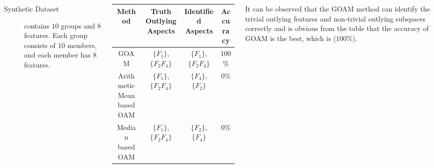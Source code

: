 \documentclass{tikzposter} %
\begin{document}
\begin{columns}


{
\begin{description}
  	\item[Synthetic Dataset] contains $10$ groups and $8$ features.
    Each group consists of $10$ members,
    and each member has $8$ features.
\end{description}
\vspace{.5cm}
\begin{tabular}{ c | c | c | c }
    \toprule
    Method     &  Truth Outlying Aspects    & Identified Aspects & Accuracy      \\
    \midrule
    GOAM       &  $\{F_1\}$, $\{F_2F_4\}$   &  $\{F_1\}$, $\{F_2F_4\}$    & 100\%    \\

     Arithmetic Mean based OAM &  $\{F_1\}$, $\{F_2F_4\}$   &  $\{F_4\}$, $\{F_2\}$    &  0\% \\

     Median based OAM &  $\{F_1\}$, $\{F_2F_4\}$   &  $\{F_2\}$, $\{F_4\}$    &           0\% \\
     \bottomrule
\end{tabular}
\vspace{.2cm}
\begin{description}
    \item
    It can be observed that the GOAM method can identify the trivial outlying features
    and non-trivial outlying subspaces correctly and is obvious from the table
    that the accuracy of GOAM is the best, which is ($100\%$).
\end{description}

}
\end{columns}
\end{document}
